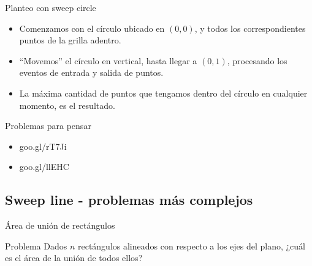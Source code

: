 \documentclass[compress]{beamer}
\begin{document}
\begin{frame}{Planteo con sweep circle}

\begin{itemize}
    \item Comenzamos con el círculo ubicado en $(0,0)$, y todos los correspondientes puntos de la grilla adentro.
    \item ``Movemos'' el círculo en vertical, hasta llegar a $(0,1)$, procesando los eventos de entrada y salida de puntos.
    \item La máxima cantidad de puntos que tengamos dentro del círculo en cualquier momento, es el resultado.
\end{itemize}

\pause


\end{frame}

\begin{frame}{Problemas para pensar}

\begin{itemize}
\item goo.gl/rT7Ji
\item goo.gl/llEHC
\end{itemize}

\end{frame}

\subsection{Sweep line - problemas más complejos}
\begin{frame}{Área de unión de rectángulos}

\begin{block}{Problema}
Dados $n$ rectángulos alineados con respecto a los ejes del plano, 
¿cuál es el área de la unión de todos ellos?
\end{block}


\end{frame}
\end{document}
